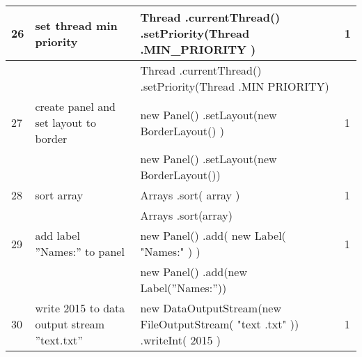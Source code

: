 \begin{longtable}{|p{}|p{}|p{}|p{}|}
		\rowcolor[HTML]{FFCCC9} 
		26                                & set thread min priority                                & Thread .currentThread() .setPriority(Thread .MIN\_PRIORITY )                                                     & 1                                       \\ \hline
		\rowcolor[HTML]{9AFF99} 
		&                                                        & Thread .currentThread() .setPriority(Thread .MIN PRIORITY)                                                       &                                         \\ \hline
		\rowcolor[HTML]{FFCCC9} 
		27                                & create panel and set layout to border                  & new Panel()  .setLayout(new BorderLayout() )                                                                     & 1                                       \\ \hline
		\rowcolor[HTML]{9AFF99} 
		&                                                        & new Panel() .setLayout(new BorderLayout())                                                                       &                                         \\ \hline
		\rowcolor[HTML]{FFCCC9} 
		28                                & sort array                                             & Arrays .sort( array )                                                                                            & 1                                       \\ \hline
		\rowcolor[HTML]{9AFF99} 
		&                                                        & Arrays .sort(array)                                                                                              &                                         \\ \hline
		\rowcolor[HTML]{FFCCC9} 
		29                                & add label ”Names:” to panel                            & new Panel() .add( new Label( "Names:" ) )                                                                        & 1                                       \\ \hline
		\rowcolor[HTML]{9AFF99} 
		&                                                        & new Panel() .add(new Label(”Names:”))                                                                            &                                         \\ \hline
		\rowcolor[HTML]{FFCCC9} 
		30                                & write 2015 to data output stream ”text.txt”            & new DataOutputStream(new FileOutputStream( "text .txt" ))  .writeInt( 2015 )                                     & 1                                       \\ \hline

\end{longtable}
